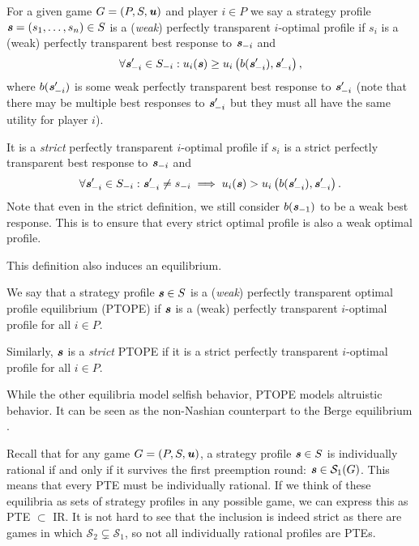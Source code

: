 \begin{definition}
	For a given game $G = (P, S, \boldsymbol{\mathit{u}})$ and player $i \in P$ we say a strategy profile $\boldsymbol{\mathit{s}} = (s_1, \dots, s_n) \in S$ is a (\textit{weak}) perfectly transparent $i$-optimal profile if
	$s_i$ is a (weak) perfectly transparent best response to $\boldsymbol{\mathit{s}}_{-i}$ and
	\[
		\forall \boldsymbol{\mathit{s}}'_{-i} \in S_{-i}: u_i(\boldsymbol{\mathit{s}}) \ge u_i\left(b(\boldsymbol{\mathit{s}}'_{-i}), \boldsymbol{\mathit{s}}'_{-i}\right),
	\]
	where $b(\boldsymbol{\mathit{s}}'_{-i})$ is some weak perfectly transparent best response to $\boldsymbol{\mathit{s}}'_{-i}$ (note that there may be multiple best responses to $\boldsymbol{\mathit{s}}'_{-i}$ but they must all have the same utility for player $i$).

	It is a \textit{strict} perfectly transparent $i$-optimal profile if $s_i$ is a strict perfectly transparent best response to $\boldsymbol{\mathit{s}}_{-i}$ and
	\[
		\forall \boldsymbol{\mathit{s}}_{-i}' \in S_{-i}: \boldsymbol{\mathit{s}}_{-i}' \ne s_{-i} \implies u_i(\boldsymbol{\mathit{s}}) > u_i\left(b(\boldsymbol{\mathit{s}}_{-i}'), \boldsymbol{\mathit{s}}_{-i}'\right).
	\]
	Note that even in the strict definition, we still consider $b(\boldsymbol{\mathit{s}}_{-1})$ to be a weak best response.
	This is to ensure that every strict optimal profile is also a weak optimal profile.
\end{definition}

This definition also induces an equilibrium.

\begin{definition}
	We say that a strategy profile $\boldsymbol{\mathit{s}} \in S$ is a (\textit{weak}) perfectly transparent optimal profile equilibrium (PTOPE) if $\boldsymbol{\mathit{s}}$ is a (weak) perfectly transparent $i$-optimal profile for all $i \in P$.

	Similarly, $\boldsymbol{\mathit{s}}$ is a \textit{strict} PTOPE if it is a strict perfectly transparent $i$-optimal profile for all $i \in P$.
\end{definition}

While the other equilibria model selfish behavior, PTOPE models altruistic behavior.
It can be seen as the non-Nashian counterpart to the Berge equilibrium \cite{berge1957theorie}.

Recall that for any game $G = (P, S, \boldsymbol{\mathit{u}})$, a strategy profile $\boldsymbol{\mathit{s}} \in S$ is individually rational if and only if it survives the first preemption round: $\boldsymbol{\mathit{s}} \in \mathcal{S}_1(G)$.
This means that every PTE must be individually rational.
If we think of these equilibria as sets of strategy profiles in any possible game, we can express this as PTE $\subset$ IR.
It is not hard to see that the inclusion is indeed strict as there are games in which $\mathcal{S}_2 \subsetneq \mathcal{S}_1$, so not all individually rational profiles are PTEs.

